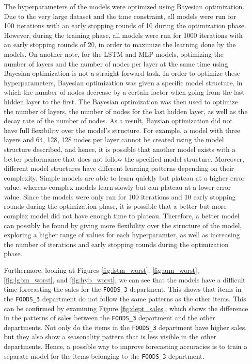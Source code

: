 The hyperparameters of the models were optimized using Bayesian optimization.
Due to the very large dataset and the time constraint, all models were run for 100 iterations with an early stopping rounds of 10 during the optimization phase. 
However, during the training phase, all models were run for 1000 iterations with an early stopping rounds of 20, in order to maximize the learning done by the models.
On another note, for the LSTM and MLP models, optimizing the number of layers and the number of nodes per layer at the same time using Bayesian optimization is not a straight forward task.
In order to optimize these hyperparameters, Bayesian optimization was given a specific model structure, in which the number of nodes decrease by a certain factor when going from the last hidden layer to the first.
The Bayesian optimization was then used to optimize the number of layers, the number of nodes for the last hidden layer, as well as the decay rate of the number of nodes.
As a result, Baysian optimization did not have full flexibility over the model's structure. 
For example, a model with three layers and 64, 128, 128 nodes per layer cannot be created using the model structure described, and hence, it is possible that another model exists with a better performance that does not follow the specified model structure.
Moreover, different model structures have different learning patterns depending on their complexity. 
Simple models are able to learn quickly but plateau at a higher error value, whereas complex models learn slowly but can plateau at a lower error value.
Since the models were only ran for 100 iterations and 10 early stopping rounds during the optimization phase, it is possible that a better but more complex model did not have enough time to plateau.
Therefore, a better model can possibly be found by giving more flexibility over the structure of the model, exploring a higher range of values for each hyperparamter, as well as increasing the number of iterations and early stopping rounds during the optimization phase.

Furthermore, looking at Figures \ref{fig:lstm_worst}, \ref{fig:ann_worst}, \ref{fig:lgbm_worst}, and \ref{fig:hyb_worst}, we can see that the models have a difficult time forecasting the sales for the \texttt{FOODS\_3} department.
This shows that items in the \texttt{FOODS\_3} department do not follow the same patterns as the other items.
This can be confirmed by examining Figure \ref{fig:dept_sales}, which shows the difference in the patterns of sales between the \texttt{FOODS\_3} department and the other departments.
Not only do the items in the \texttt{FOODS\_3} department have higher sales, but they also show a seasonality pattern that is less visible in the other departments.
Hence, a possible way to improve forecasting accuracies is to train a separate model for the items belonging to the \texttt{FOODS\_3} department.

